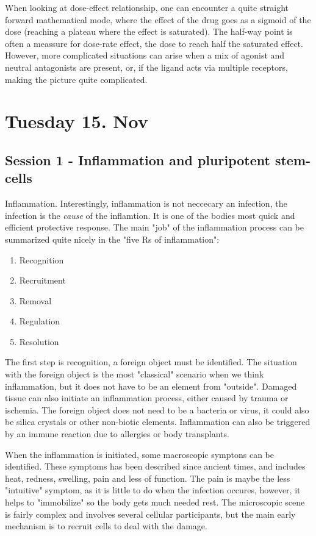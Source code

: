 \documentclass[12p]{article}
\begin{document}
When looking at dose-effect relationship, one can encounter a quite straight forward mathematical mode, where the effect of the drug goes as a sigmoid of the dose (reaching a plateau where the effect is saturated).
The half-way point is often a meassure for dose-rate effect, the dose to reach half the saturated effect.
However, more complicated situations can arise when a mix of agonist and neutral antagonists are present, or, if the ligand acts via multiple receptors, making the picture quite complicated.

\section*{Tuesday 15. Nov}

\subsection*{Session 1 - Inflammation and pluripotent stem-cells}

Inflammation. 
Interestingly, inflammation is not neccecary an infection, the infection is the \emph{cause} of the inflamtion.
It is one of the bodies most quick and efficient protective response.
The main "job" of the inflammation process can be summarized quite nicely in the "five Rs of inflammation":

\begin{enumerate}
    \item
	Recognition 
    \item
	Recruitment 
    \item
	Removal
    \item
	Regulation
    \item
	Resolution
\end{enumerate}

The first step is recognition, a foreign object must be identified.
The situation with the foreign object is the most "classical" scenario when we think inflammation, but it does not have to be an element from "outside".
Damaged tissue can also initiate an inflammation process, either caused by trauma or ischemia.
The foreign object does not need to be a bacteria or virus, it could also be silica crystals or other non-biotic elements.
Inflammation can also be triggered by an immune reaction due to allergies or body transplants.

When the inflammation is initiated, some macroscopic symptons can be identified.
These symptoms has been described since ancient times, and includes heat, redness, swelling, pain and less of function.
The pain is maybe the less "intuitive" symptom, as it is little to do when the infection occures, however, it helps to "immobilize" so the body gets much needed rest.
The microscopic scene is fairly complex and involves several cellular participants, but the main early mechanism is to recruit cells to deal with the damage. 
\end{document}
